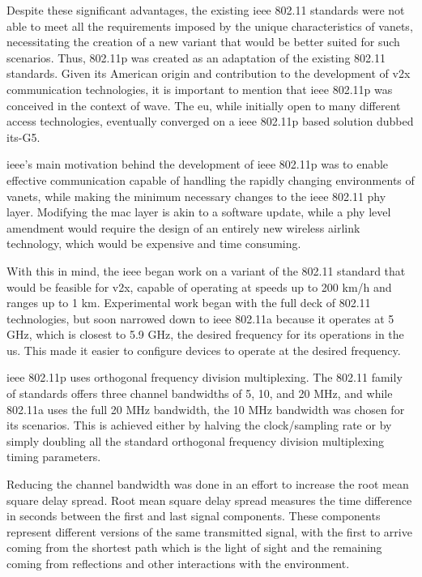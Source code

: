 Despite these significant advantages, the existing \gls{ieee} 802.11 standards were not able to meet all the requirements imposed by the unique characteristics of \glspl{vanet}, necessitating the creation of a new variant that would be better suited for such scenarios. Thus, 802.11p was created as an adaptation of the existing 802.11 standards. Given its American origin and contribution to the development of \gls{v2x} communication technologies, it is important to mention that \gls{ieee} 802.11p was conceived in the context of \gls{wave}\cite{jiang_ieee_2008}. The \gls{eu}, while initially open to many different access technologies, eventually converged on a \gls{ieee} 802.11p based solution dubbed \gls{its}-G5.

\gls{ieee}'s main motivation behind the development of \gls{ieee} 802.11p was to enable effective communication capable of handling the rapidly changing environments of \glspl{vanet}\cite{jiang_ieee_2008}, while making the minimum necessary changes to the \gls{ieee} 802.11 \gls{phy} layer. Modifying the \gls{mac} layer is akin to a software update, while a \gls{phy} level amendment would require the design of an entirely new wireless airlink technology\cite{jiang_ieee_2008}, which would be expensive and time consuming. 

With this in mind, the \gls{ieee} began work on a variant of the 802.11 standard that would be feasible for \gls{v2x}, capable of operating at speeds up to 200 km/h and ranges up to 1 km\cite{jakubiak_state_2008}. Experimental work began with the full deck of 802.11 technologies\cite{toor_vehicle_2008}, but soon narrowed down to \gls{ieee} 802.11a because it operates at 5 GHz, which is closest to 5.9 GHz, the desired frequency for \gls{its} operations in the \gls{us}. This made it easier to configure devices to operate at the desired frequency\cite{jiang_ieee_2008}.


\gls{ieee} 802.11p uses orthogonal frequency division multiplexing. The 802.11 family of standards offers three channel bandwidths of 5, 10, and 20 MHz, and while 802.11a uses the full 20 MHz bandwidth, the 10 MHz bandwidth was chosen for \gls{its} scenarios. This is achieved either by halving the clock/sampling rate or by simply doubling all the standard orthogonal frequency division multiplexing timing parameters\cite{rohde__schwarz_intelligent_2019}.

Reducing the channel bandwidth was done in an effort to increase the root mean square delay spread\cite{toor_vehicle_2008}. Root mean square delay spread measures the time difference in seconds between the first and last signal components. These components represent different versions of the same transmitted signal, with the first to arrive coming from the shortest path which is the light of sight and the remaining coming from reflections and other interactions with the environment.

